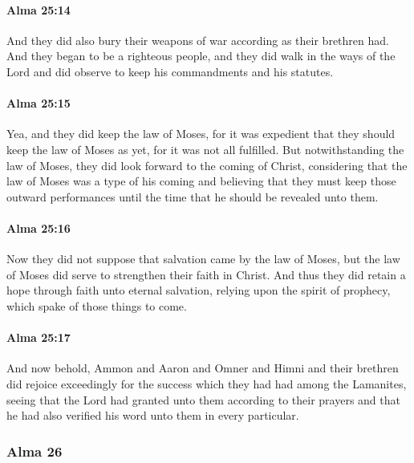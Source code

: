 		\paragraph{Alma 25:14} %
			\label{ALMA-25-14}

			And they did also bury their weapons of war according as their brethren had.
			And they began to be a righteous people,
			and they did walk in the ways of the Lord
			and did observe to keep his commandments and his statutes.

		\paragraph{Alma 25:15} %
			\label{ALMA-25-15}

			Yea, and they did keep the law of Moses,
			for it was expedient that they should keep the law of Moses as yet,
			for it was not all fulfilled.
			But notwithstanding the law of Moses,
			they did look forward to the coming of Christ,
			considering that the law of Moses was a type of his coming
			and believing that they must keep those outward performances
			until the time that he should be revealed unto them.

		\paragraph{Alma 25:16} %
			\label{ALMA-25-16}

			Now they did not suppose that salvation came by the law of Moses,
			but the law of Moses did serve to strengthen their faith in Christ.
			And thus they did retain a hope through faith unto eternal salvation,
			relying upon the spirit of prophecy, which spake of those things to come.

		\paragraph{Alma 25:17} %
			\label{ALMA-25-17}

			And now behold, Ammon and Aaron and Omner and Himni and their brethren
			did rejoice exceedingly for the success which they had had among the Lamanites,
			seeing that the Lord had granted unto them according to their prayers
			and that he had also verified his word unto them in every particular.

	\subsubsection{Alma 26} %
		\label{ALMA-26}
		
